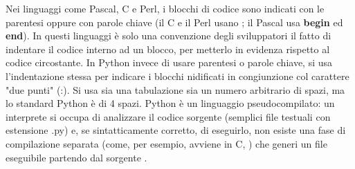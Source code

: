 %
Nei linguaggi come Pascal, C e Perl, i blocchi di codice sono indicati con le parentesi oppure con parole chiave 
(il C e il Perl usano \textbf{{ }}; il Pascal usa \textbf{begin} ed \textbf{end}). In questi linguaggi è solo una convenzione degli sviluppatori il fatto di 
indentare il codice interno ad un blocco, per metterlo in evidenza rispetto al codice circostante. In Python invece di usare parentesi 
o parole chiave, si usa l'indentazione stessa per indicare i blocchi nidificati in congiunzione col carattere "due punti" (:). Si usa 
sia una tabulazione sia un numero arbitrario di spazi, ma lo standard Python è di 4 spazi.
Python è un linguaggio pseudocompilato: un interprete si occupa di analizzare il codice sorgente (semplici file testuali con 
estensione .py) e, se sintatticamente corretto, di eseguirlo, non esiste una fase di compilazione separata (come, per esempio, 
avviene in C, ) che generi un file eseguibile partendo dal sorgente \cite{python-documentation}.
%
